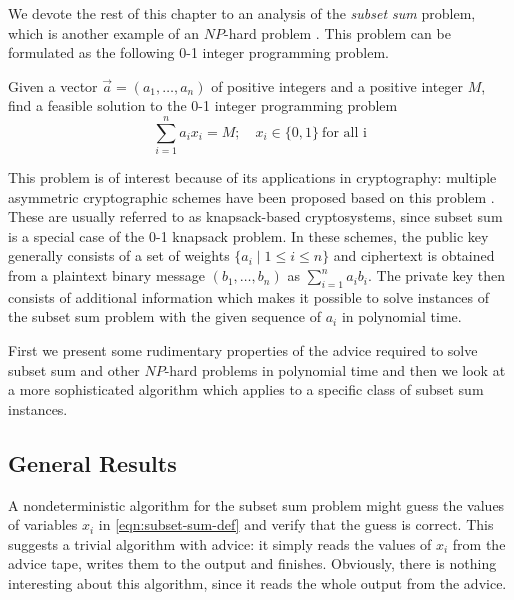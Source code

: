 We devote the rest of this chapter to an analysis of the \emph{subset sum}
problem, which is another example of an $NP$-hard problem
\cite{subset-sum-np-hard}. This problem can be formulated as the
following 0-1 integer programming problem.

\begin{definition}\label{definition:subset-sum}
    Given a vector $\vec{a} = (a_1, \dots, a_n)$ of positive integers and
    a positive integer $M$, find a feasible solution to the 0-1 integer
    programming problem
    \begin{equation}\label{eqn:subset-sum-def}
        \sum_{i=1}^n a_ix_i = M; \quad x_i \in \{0,1\} \  \text{for all i}
    \end{equation}
\end{definition}

This problem is of interest because of its applications in cryptography:
multiple asymmetric cryptographic schemes have been proposed based on this
problem \cite{merkle-hellman, chor-rivest}. These are usually referred to
as knapsack-based cryptosystems, since subset sum is a special case of the
0-1 knapsack problem. In these schemes, the public key generally consists
of a set of weights $\{a_i \mid 1 \leq i \leq n\}$ and ciphertext is
obtained from a plaintext binary message $(b_1, \dots, b_n)$ as
$\sum_{i=1}^n a_ib_i$. The private key then consists of additional
information which makes it possible to solve instances of the subset sum
problem with the given sequence of $a_i$ in polynomial time.

First we present some rudimentary properties of the advice required to
solve subset sum and other $NP$-hard problems in polynomial time and then
we look at a more sophisticated algorithm which applies to a specific
class of subset sum instances.

\subsection{General Results}
\label{section:subset-sum-general}

A nondeterministic algorithm for the subset sum problem might guess the
values of variables $x_i$ in \eqref{eqn:subset-sum-def} and verify that
the guess is correct. This suggests a trivial algorithm with advice: it
simply reads the values of $x_i$ from the advice tape, writes them to the
output and finishes. Obviously, there is nothing interesting about this
algorithm, since it reads the whole output from the advice.

